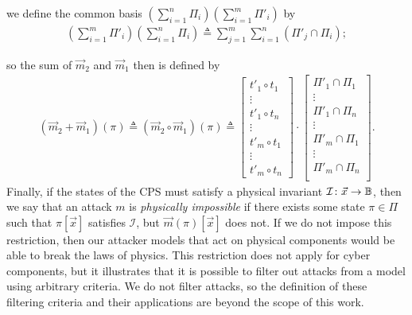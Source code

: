 {{\begin{definition}[Attack]
we define the common basis $(\sum_{i=1}^n\Pi_i)(\sum_{i=1}^m\Pi'_i)$ by 
\begin{align}
  \left(\sum_{i=1}^m\Pi'_i\right)\left(\sum_{i=1}^n\Pi_i\right)\triangleq \sum_{j=1}^m\sum_{i=1}^n(\Pi'_j\cap\Pi_i);
\end{align}

so the sum of $\vec{m}_2$ and $\vec{m}_1$ then is defined by
\begin{align}
  (\vec{m}_2+\vec{m}_1)(\pi)\triangleq(\vec{m}_2\circ\vec{m}_1)(\pi)\triangleq
  \begin{bmatrix}
    t'_{1}\circ t_1 \\
    \vdots \\
    t'_{1}\circ t_n\\
    \vdots \\
    t'_{m}\circ t_1 \\
    \vdots \\
    t'_{m}\circ t_n
  \end{bmatrix}
  \cdot
  \begin{bmatrix}
    \Pi'_{1}\cap\Pi_{1} \\
    \vdots \\
    \Pi'_{1}\cap\Pi_{n}\\
    \vdots \\
    \Pi'_{m}\cap\Pi_{1} \\
    \vdots \\
    \Pi'_{m}\cap\Pi_{n}\\
  \end{bmatrix}.
\end{align} 
Finally, if the states of the CPS must satisfy a physical invariant $\mathcal{I}\colon \vec{x}\rightarrow{\mathbb{B}}$, then we say that an attack $m$ is \emph{physically impossible} if there exists some state $\pi\in \Pi$ such that $\pi[\vec{x}]$ satisfies $\mathcal{I}$, but $\vec{m}(\pi)[\vec{x}]$ does not. If we do not impose this restriction, then our attacker models that act on physical components would be able to break the laws of physics. This restriction does not apply for cyber components, but it illustrates that it is possible to filter out attacks from a model using arbitrary criteria. We do not filter attacks, so the definition of these filtering criteria and their applications are beyond the scope of this work. 
\end{definition}

}}
